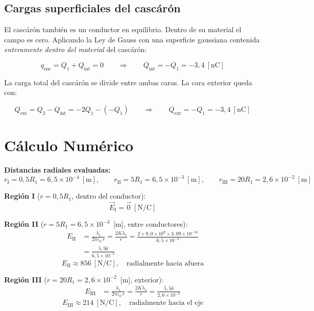 \documentclass[12pt,letterpaper]{article}
\begin{document}
\bigskip

\subsection*{Cargas superficiales del casc\'ar\'on}

El casc\'ar\'on tambi\'en es un conductor en equilibrio.
Dentro de su material el campo es cero. Aplicando la Ley de Gauss con
una superficie gaussiana contenida \emph{enteramente dentro del material}
del casc\'ar\'on:

\[
    q_\text{enc} = Q_1 + Q_\text{int} = 0
    \qquad\Longrightarrow\qquad
    \boxed{Q_\text{int} = -Q_1 = -3{,}4\ [\text{nC}]}
\]

La carga total del casc\'ar\'on se divide entre ambas caras.
La cara exterior queda con:

\[
    Q_\text{ext} = Q_2 - Q_\text{int}
    = -2Q_1 - (-Q_1)
    \qquad\Longrightarrow\qquad
    \boxed{Q_\text{ext} = -Q_1 = -3{,}4\ [\text{nC}]}
\]

\section*{C\'alculo Num\'erico}

\textbf{Distancias radiales evaluadas:}
\[
    r_\text{I}   = 0{,}5R_1 = 6{,}5\times10^{-4}\ [\text{m}],\qquad
    r_\text{II}  = 5R_1    = 6{,}5\times10^{-3}\ [\text{m}],\qquad
    r_\text{III} = 20R_1   = 2{,}6\times10^{-2}\ [\text{m}]
\]

\noindent\textbf{Regi\'on I} ($r = 0{,}5R_1$, dentro del conductor):
\[
    \vec{E}_\text{I} = \vec{0}\ [\text{N/C}]
\]

\noindent\textbf{Regi\'on II} ($r = 5R_1 = 6{,}5\times10^{-3}$~[m], entre conductores):
\begin{align*}
    E_\text{II}
        &= \frac{\lambda_1}{2\pi\varepsilon_0\,r}
         = \frac{2K\lambda_1}{r}
         = \frac{2\times9{,}0\times10^{9}\times3{,}09\times10^{-10}}{6{,}5\times10^{-3}} \\[6pt]
        &= \frac{5{,}56}{6{,}5\times10^{-3}}
\end{align*}
\[
    \boxed{E_\text{II} \approx 856\ [\text{N/C}],\quad \text{radialmente hacia afuera}}
\]

\noindent\textbf{Regi\'on III} ($r = 20R_1 = 2{,}6\times10^{-2}$~[m], exterior):
\begin{align*}
    E_\text{III}
        &= \frac{\lambda_1}{2\pi\varepsilon_0\,r}
         = \frac{2K\lambda_1}{r}
         = \frac{5{,}56}{2{,}6\times10^{-2}}
\end{align*}
\[
    \boxed{E_\text{III} \approx 214\ [\text{N/C}],\quad \text{radialmente hacia el eje}}
\]
\end{document}
